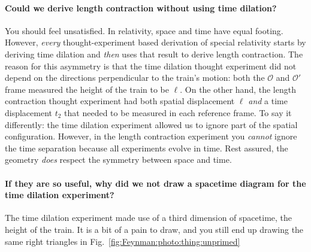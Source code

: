 \begin{subappendices}
\paragraph{Could we derive length contraction without using time dilation?} You should feel unsatisfied. In relativity, space and time have equal footing. However, \emph{every} thought-experiment based derivation of special relativity starts by deriving time dilation and \emph{then} uses that result to derive length contraction. The reason for this asymmetry is that the time dilation thought experiment did not depend on the directions perpendicular to the train's motion: both the $\mathcal O$ and $\mathcal O'$ frame measured the height of the train to be $\ell$. On the other hand, the length contraction thought experiment had both spatial displacement $\ell$ \emph{and} a time displacement $t_2$ that needed to be measured in each reference frame. To say it differently: the time dilation experiment allowed us to ignore part of the spatial configuration. However, in the length contraction experiment you \emph{cannot} ignore the time separation because all experiments evolve in time. Rest assured, the geometry \emph{does} respect the symmetry between space and time.

\paragraph{If they are so useful, why did we not draw a spacetime diagram for the time dilation experiment?} The time dilation experiment made use of a third dimension of spacetime, the height of the train. It is a bit of a pain to draw, and you still end up drawing the same right triangles in Fig.~\ref{fig:Feynman:photo:thing:unprimed}



\end{subappendices}
